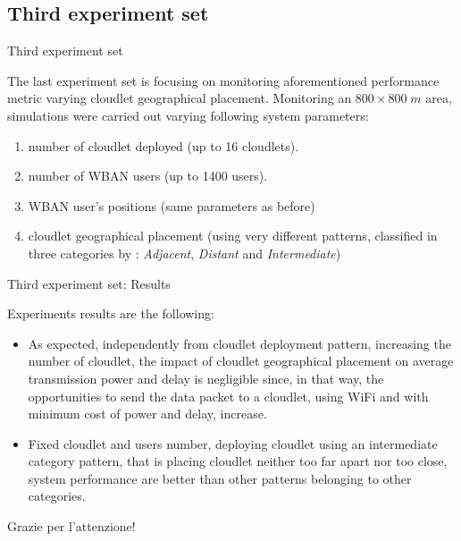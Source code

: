 \documentclass[10pt]{beamer}
\begin{document}
\subsection{Third experiment set}
\begin{frame}{Third experiment set}

The last experiment set is focusing on monitoring aforementioned performance metric varying cloudlet geographical placement. Monitoring an $800 \times 800 \; m$ area, simulations were carried out varying following system parameters:

\begin{enumerate}
\item number of cloudlet deployed (up to 16 cloudlets).
\item number of WBAN users (up to 1400 users).
\item WBAN user's positions (same parameters as before)
\item cloudlet geographical placement (using very different patterns, classified in three categories by \citet{MSAReport}: \textit{Adjacent}, \textit{Distant} and \textit{Intermediate})
\end{enumerate}

\end{frame} 
\begin{frame}{Third experiment set: Results}

Experiments results are the following:

\begin{itemize}

\item As expected, independently from cloudlet deployment pattern, increasing the number of cloudlet, the impact of cloudlet geographical placement on average transmission power and delay is negligible since, in that way, the opportunities to send the data packet to a cloudlet, using WiFi and with minimum cost of power and delay, increase.

\item Fixed cloudlet and users number, deploying cloudlet using an intermediate category pattern, that is placing cloudlet neither too far apart nor too close, system performance are better than other patterns belonging to other categories.

\end{itemize}
\end{frame}


\begin{frame}
  Grazie per l'attenzione!
\end{frame}

\end{document}
